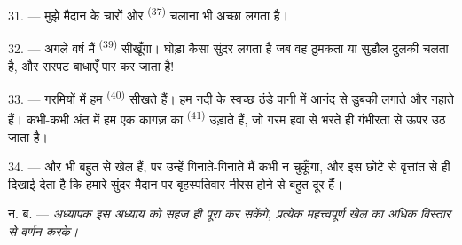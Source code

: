 \VUsaut{4.6mm}
\VUsaut{3.0mm}

31. --- मुझे मैदान के चारों ओर  \textsuperscript{(37)} चलाना भी
अच्छा लगता है।

32. --- अगले वर्ष मैं  \textsuperscript{(39)} सीखूँगा। घोड़ा
कैसा सुंदर लगता है जब वह ठुमकता या सुडौल दुलकी चलता है, और सरपट बाधाएँ पार कर
जाता है!

33. --- गरमियों में हम  \textsuperscript{(40)} सीखते हैं। हम नदी के
स्वच्छ ठंडे पानी में आनंद से डुबकी लगाते और नहाते हैं। कभी-कभी अंत में हम एक
कागज़ का  \textsuperscript{(41)} उड़ाते हैं, जो गरम हवा से भरते
ही गंभीरता से ऊपर उठ जाता है।

34. --- और भी बहुत से खेल हैं, पर उन्हें गिनाते-गिनाते मैं कभी न चुकूँगा, और
इस छोटे से वृत्तांत से ही दिखाई देता है कि हमारे सुंदर मैदान पर बृहस्पतिवार
नीरस होने से बहुत दूर हैं।

न. ब. --- \textit{अध्यापक इस अध्याय को सहज ही पूरा कर सकेंगे, प्रत्येक
महत्त्वपूर्ण खेल का अधिक विस्तार से वर्णन करके।}
\VUsaut{6.0mm}
\VUfilet{22mm}
